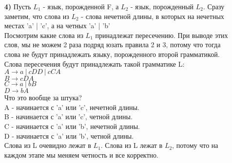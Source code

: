 \documentclass[12pt]{article}
\begin{document}
\begin{enumerate}
  \item[\bf 4)] Пусть $L_1$ - язык, порожденной F, а $L_2$ - язык, порожденный $L_2$. 
  Сразу заметим, что слова из $L_2$ - слова нечетной длины, в которых на нечетных местах 'a' | 'c', а на четных 'a' | 'b'\\ 
  Посмотрим какие слова из $L_1$ принадлежат пересечению. При выводе этих слов, мы не можем 2 раза подряд юзать правила 2 и 3, потому что тогда слова не будут принадлежать языку, порожденного второй грамматикой.\\
  Слова пересечения будут принадлежать такой грамматике L:\\
  $A \to a\ |\ cDD\ |\ cCA$ \\
  $B \to cDA$ \\
  $C \to a\ |\ bB$ \\
  $D \to bA$ \\
  Что это вообще за штука?\\
  A - начинается с 'a' или 'c', нечетной длины.\\
  B - начинается с 'a' или 'c', четной длины.\\
  C - начинается с 'a' или 'b', нечетной длины.\\
  D - начинается с 'a' или 'b', четной длины.\\
  Слова из L очевидно лежат в $L_1$. Слова из L лежат в $L_2$, потому что на каждом этапе мы меняем четность и все корректно.
 
\end{enumerate}
\end{document}
